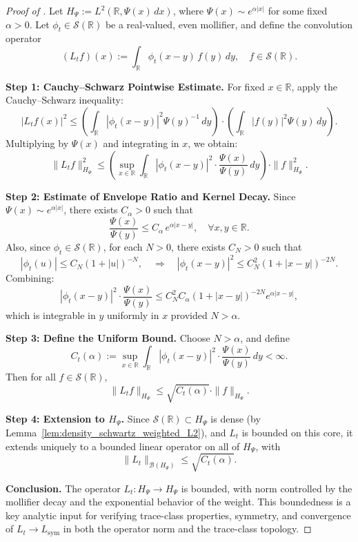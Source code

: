 \begin{proof}[Proof of ]
Let \( H_\Psi := L^2(\mathbb{R}, \Psi(x)\, dx) \), where \( \Psi(x) \sim e^{\alpha |x|} \) for some fixed \( \alpha > 0 \). Let \( \phi_t \in \mathcal{S}(\mathbb{R}) \) be a real-valued, even mollifier, and define the convolution operator
\[
(L_t f)(x) := \int_{\mathbb{R}} \phi_t(x - y)\, f(y)\, dy, \quad f \in \mathcal{S}(\mathbb{R}).
\]

\medskip
\noindent\textbf{Step 1: Cauchy–Schwarz Pointwise Estimate.}
For fixed \( x \in \mathbb{R} \), apply the Cauchy–Schwarz inequality:
\[
|L_t f(x)|^2 \le \left( \int_{\mathbb{R}} |\phi_t(x - y)|^2 \Psi(y)^{-1}\, dy \right)
                \cdot \left( \int_{\mathbb{R}} |f(y)|^2 \Psi(y)\, dy \right).
\]
Multiplying by \( \Psi(x) \) and integrating in \( x \), we obtain:
\[
\| L_t f \|_{H_\Psi}^2 \le \left( \sup_{x \in \mathbb{R}} \int_{\mathbb{R}} |\phi_t(x - y)|^2 \cdot \frac{\Psi(x)}{\Psi(y)}\, dy \right) \cdot \| f \|_{H_\Psi}^2.
\]

\medskip
\noindent\textbf{Step 2: Estimate of Envelope Ratio and Kernel Decay.}
Since \( \Psi(x) \sim e^{\alpha |x|} \), there exists \( C_\alpha > 0 \) such that
\[
\frac{\Psi(x)}{\Psi(y)} \le C_\alpha\, e^{\alpha |x - y|}, \quad \forall x, y \in \mathbb{R}.
\]
Also, since \( \phi_t \in \mathcal{S}(\mathbb{R}) \), for each \( N > 0 \), there exists \( C_N > 0 \) such that
\[
|\phi_t(u)| \le C_N (1 + |u|)^{-N}, \quad \Rightarrow \quad |\phi_t(x - y)|^2 \le C_N^2 (1 + |x - y|)^{-2N}.
\]
Combining:
\[
|\phi_t(x - y)|^2 \cdot \frac{\Psi(x)}{\Psi(y)} \le C_N^2 C_\alpha (1 + |x - y|)^{-2N} e^{\alpha |x - y|},
\]
which is integrable in \( y \) uniformly in \( x \) provided \( N > \alpha \).

\medskip
\noindent\textbf{Step 3: Define the Uniform Bound.}
Choose \( N > \alpha \), and define
\[
C_t(\alpha) := \sup_{x \in \mathbb{R}} \int_{\mathbb{R}} |\phi_t(x - y)|^2 \cdot \frac{\Psi(x)}{\Psi(y)}\, dy < \infty.
\]
Then for all \( f \in \mathcal{S}(\mathbb{R}) \),
\[
\| L_t f \|_{H_\Psi} \le \sqrt{C_t(\alpha)} \cdot \| f \|_{H_\Psi}.
\]

\medskip
\noindent\textbf{Step 4: Extension to \( H_\Psi \).}
Since \( \mathcal{S}(\mathbb{R}) \subset H_\Psi \) is dense (by Lemma~\ref{lem:density_schwartz_weighted_L2}), and \( L_t \) is bounded on this core, it extends uniquely to a bounded linear operator on all of \( H_\Psi \), with
\[
\| L_t \|_{\mathcal{B}(H_\Psi)} \le \sqrt{C_t(\alpha)}.
\]

\medskip
\noindent\textbf{Conclusion.}
The operator \( L_t \colon H_\Psi \to H_\Psi \) is bounded, with norm controlled by the mollifier decay and the exponential behavior of the weight. This boundedness is a key analytic input for verifying trace-class properties, symmetry, and convergence of \( L_t \to L_{\mathrm{sym}} \) in both the operator norm and the trace-class topology.
\end{proof}
